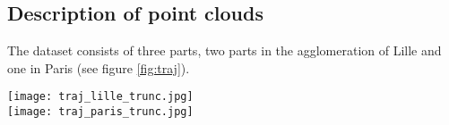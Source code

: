\documentclass[a4paper, 10pt, journal]{article}
\begin{document}
\subsection{Description of point clouds} \label{subsec:description_pc}

The dataset consists of three parts, two parts in the agglomeration of Lille and one in Paris (see figure \ref{fig:traj}).

\begin{center}\centering
 \texttt{[image: traj\_lille\_trunc.jpg]}
\\ \vspace{0.1cm}
 \texttt{[image: traj\_paris\_trunc.jpg]}
\end{center}
\end{document}

